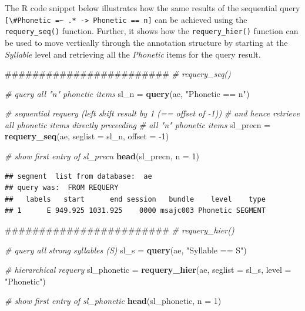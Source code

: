 \documentclass[]{book}
\newenvironment{Shaded}{\begin{snugshade}}{\end{snugshade}}
\newcommand{\CommentTok}[1]{\textcolor[rgb]{0.56,0.35,0.01}{\textit{#1}}}
\newcommand{\DataTypeTok}[1]{\textcolor[rgb]{0.13,0.29,0.53}{#1}}
\newcommand{\DecValTok}[1]{\textcolor[rgb]{0.00,0.00,0.81}{#1}}
\newcommand{\KeywordTok}[1]{\textcolor[rgb]{0.13,0.29,0.53}{\textbf{#1}}}
\newcommand{\NormalTok}[1]{#1}
\newcommand{\StringTok}[1]{\textcolor[rgb]{0.31,0.60,0.02}{#1}}
\theoremstyle{definition}
\theoremstyle{definition}
\theoremstyle{definition}
\theoremstyle{remark}
\begin{document}
The R code snippet below illustrates how the same results of the
sequential query
\texttt{{[}\textbackslash{}\#Phonetic\ =\textasciitilde{}\ .*\ -\textgreater{}\ Phonetic\ ==\ n{]}}
can be achieved using the \texttt{requery\_seq()} function. Further, it
shows how the \texttt{requery\_hier()} function can be used to move
vertically through the annotation structure by starting at the
\emph{Syllable} level and retrieving all the \emph{Phonetic} items for
the query result.

\begin{Shaded}
\begin{Highlighting}[]
\NormalTok{########################}
\CommentTok{# requery_seq()}

\CommentTok{# query all "n" phonetic items}
\NormalTok{sl_n =}\StringTok{ }\KeywordTok{query}\NormalTok{(ae, }\StringTok{"Phonetic == n"}\NormalTok{)}

\CommentTok{# sequential requery (left shift result by 1 (== offset of -1))}
\CommentTok{# and hence retrieve all phonetic items directly preceeding}
\CommentTok{# all "n" phonetic items}
\NormalTok{sl_precn =}\StringTok{ }\KeywordTok{requery_seq}\NormalTok{(ae, }\DataTypeTok{seglist =}\NormalTok{ sl_n, }\DataTypeTok{offset =} \DecValTok{-1}\NormalTok{)}

\CommentTok{# show first entry of sl_precn}
\KeywordTok{head}\NormalTok{(sl_precn, }\DataTypeTok{n =} \DecValTok{1}\NormalTok{)}
\end{Highlighting}
\end{Shaded}

\begin{verbatim}
## segment  list from database:  ae 
## query was:  FROM REQUERY 
##   labels   start      end session   bundle    level    type
## 1      E 949.925 1031.925    0000 msajc003 Phonetic SEGMENT
\end{verbatim}

\begin{Shaded}
\begin{Highlighting}[]
\NormalTok{########################}
\CommentTok{# requery_hier()}

\CommentTok{# query all strong syllables (S)}
\NormalTok{sl_s =}\StringTok{ }\KeywordTok{query}\NormalTok{(ae, }\StringTok{"Syllable == S"}\NormalTok{)}

\CommentTok{# hierarchical requery}
\NormalTok{sl_phonetic =}\StringTok{ }\KeywordTok{requery_hier}\NormalTok{(ae, }\DataTypeTok{seglist =}\NormalTok{ sl_s,}
                           \DataTypeTok{level =} \StringTok{"Phonetic"}\NormalTok{)}

\CommentTok{# show first entry of sl_phonetic}
\KeywordTok{head}\NormalTok{(sl_phonetic, }\DataTypeTok{n =} \DecValTok{1}\NormalTok{)}
\end{Highlighting}
\end{Shaded}
\end{document}
